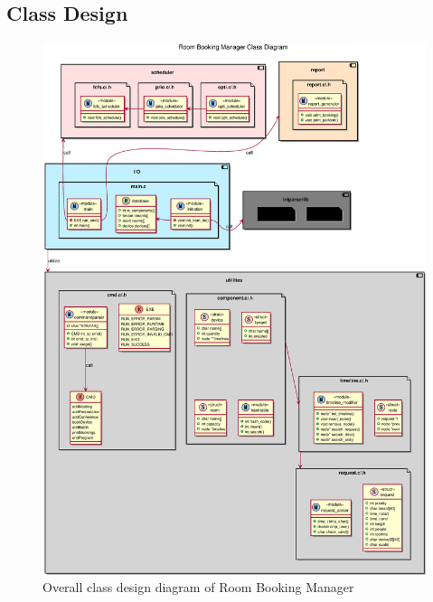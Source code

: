 \documentclass{article}
\begin{document}
        \subsection{Class Design}
            \begin{figure}[!htbp]
                \centering
                \includegraphics[scale=0.4]{./img/eps/class_diagram.eps}
                \caption{Overall class design diagram of Room Booking Manager}
            \end{figure}
\end{document}
